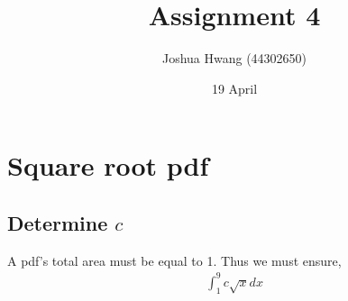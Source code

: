 \documentclass{article}
\title{Assignment 4}
\author{Joshua Hwang (44302650)}
\date{19 April}
\begin{document}
\maketitle

\section{Square root pdf}
\subsection{Determine $c$}
A pdf's total area must be equal to 1.
Thus we must ensure,
\begin{align*}
    \int_1^9 c\sqrt{x} dx
\end{align*}
\end{document}
